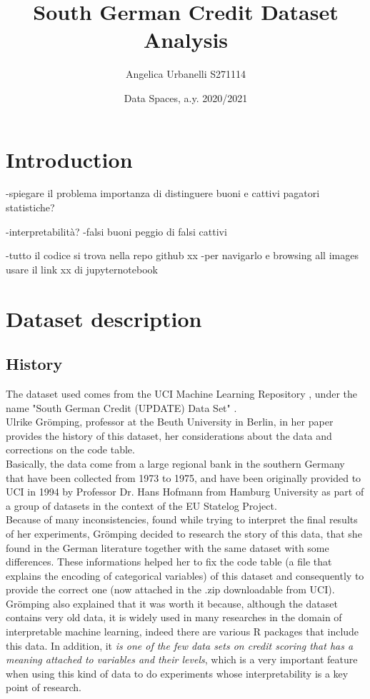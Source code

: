 \documentclass[letterpaper]{article}
\begin{document}
	\title{South German Credit Dataset Analysis}
	\author{Angelica Urbanelli S271114}
	\date{Data Spaces, a.y. 2020/2021}
	\maketitle
	
	\tableofcontents
	
	\newpage 
	\section{Introduction}
	-spiegare il problema
	importanza di distinguere buoni e cattivi pagatori
	statistiche?
	
	-interpretabilità?
	-falsi buoni peggio di falsi cattivi
	
	
	-tutto il codice si trova nella repo github xx
	-per navigarlo e browsing all images usare il link xx di jupyternotebook
	
	\section{Dataset description}
	\subsection{History}
	The dataset used comes from the UCI Machine Learning Repository \cite{uci}, under the name "South German Credit (UPDATE) Data Set" \cite{dataset}. \\
	Ulrike Grömping, professor at the Beuth University in Berlin, in her paper \cite{gromping} provides the history of this dataset, her considerations about the data and corrections on the code table.\\
	Basically, the data come from a large regional bank in the southern Germany that have been collected from 1973 to 1975, and have been originally provided to UCI in 1994 by Professor Dr. Hans Hofmann from Hamburg University \cite{hofmann} as part of a group of datasets in the context of the EU Statelog Project.\\
	Because of many inconsistencies, found while trying to interpret the final results of her experiments, Grömping decided to research the story of this data, that she found in the German literature together with the same dataset with some differences. These informations helped her to fix the code table (a file that explains the encoding of categorical variables) of this dataset and consequently to provide the correct one (now attached in the .zip downloadable from UCI). \\ 
	Grömping also explained that it was worth it because, although the dataset contains very old data, it is widely used in many researches in the domain of interpretable machine learning, indeed there are various R packages that include this data. In addition, it \emph{is one of the few data sets on credit scoring that has a meaning attached to variables and their levels}, which is a very important feature when using this kind of data to do experiments whose interpretability is a key point of research.  \\
	
\end{document}
